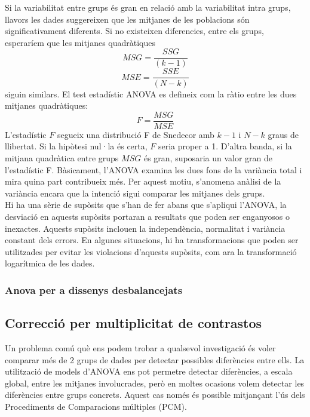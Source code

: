 \documentclass[english]{article}
\begin{document}
Si la variabilitat entre grups és gran en relació amb la variabilitat intra grups, llavors les dades suggereixen que les mitjanes de les poblacions són significativament diferents. Si no existeixen diferencies, entre els grups, esperaríem que les mitjanes quadràtiques
\begin{equation*}
MSG = \frac{SSG}{(k-1)}
\end{equation*}
\begin{equation*}
MSE = \frac{SSE}{(N-k)}
\end{equation*}
siguin similars. El test estadístic ANOVA es defineix com la ràtio entre les dues mitjanes quadràtiques:
\begin{equation*}
F = \frac{MSG}{MSE}
\end{equation*}
L'estadístic $F$ segueix una distribució F de Snedecor amb $k-1$ i $N-k$ graus de llibertat. Si la hipòtesi nul·la és certa, $F$ seria proper a 1. D'altra banda, si la mitjana quadràtica entre grups $MSG$ és gran, suposaria un valor gran de l'estadístic F. Bàsicament, l'ANOVA examina les dues fons de la variància total i mira quina part contribueix més. Per aquest motiu, s'anomena anàlisi de la variància encara que la intenció sigui comparar les mitjanes dels grups.
\\

Hi ha una sèrie de supòsits que s'han de fer abans que s'apliqui l'ANOVA, la desviació en aquests supòsits portaran a resultats que poden ser enganyosos o inexactes. Aquests supòsits inclouen la independència, normalitat i variància constant dels errors. En algunes situacions, hi ha transformacions que poden ser
utilitzades per evitar les violacions d'aquests supòsits, com ara la transformació logarítmica de les dades.

\subsubsection{Anova per a dissenys desbalancejats}
\clearpage

\subsection{Correcció per multiplicitat de contrastos}
Un problema comú què ens podem trobar a qualsevol investigació és voler comparar més de 2 grups de dades per detectar possibles diferències entre ells. La utilització de models d'ANOVA ens pot permetre detectar diferències, a escala global, entre les mitjanes involucrades, però en moltes ocasions volem detectar les diferències entre grups concrets. Aquest cas només és possible mitjançant l'ús dels Procediments de Comparacions múltiples (PCM).
\\
\end{document}
